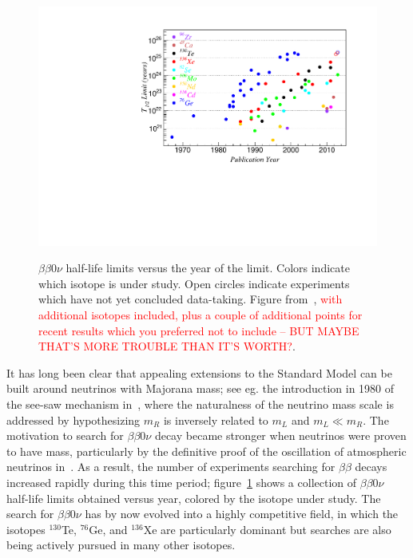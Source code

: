 \begin{figure}
\begin{center}
\includegraphics[keepaspectratio=true,width=\textwidth]{halflife_vs_year.pdf}
\end{center}
\renewcommand{\baselinestretch}{1}
\small\normalsize
\begin{quote}
\caption{$\beta\beta 0\nu$ half-life limits versus the year of the limit.  Colors indicate which isotope is under study.  Open circles indicate experiments which have not yet concluded data-taking.  Figure from~\cite{CarterReview2014}, \textcolor{red}{with additional isotopes included, plus a couple of additional points for recent results which you preferred not to include -- BUT MAYBE THAT'S MORE TROUBLE THAN IT'S WORTH?}.}
\label{fig:Halflife_vs_year}
\end{quote}
\end{figure}
\renewcommand{\baselinestretch}{2}
\small\normalsize

It has long been clear that appealing extensions to the Standard Model can be built around neutrinos with Majorana mass; see eg. the introduction in 1980 of the see-saw mechanism in~\cite{PhysRevLett.44.912}, where the naturalness of the neutrino mass scale is addressed by hypothesizing $m_R$ is inversely related to $m_L$ and $m_L \ll m_R$.  The motivation to search for $\beta\beta 0\nu$ decay became stronger when neutrinos were proven to have mass, particularly by the definitive proof of the oscillation of atmospheric neutrinos in~\cite{SuperK}.  As a result, the number of experiments searching for $\beta\beta$ decays increased rapidly during this time period; figure~\ref{fig:Halflife_vs_year} shows a collection of $\beta\beta 0\nu$ half-life limits obtained versus year, colored by the isotope under study.  The search for $\beta\beta 0\nu$ has by now evolved into a highly competitive field, in which the isotopes $^{130}$Te, $^{76}$Ge, and $^{136}$Xe are particularly dominant but searches are also being actively pursued in many other isotopes.

